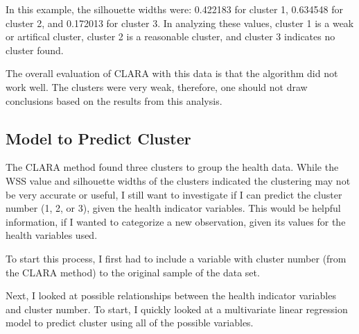 \documentclass[12pt,twoside]{amherstthesis}
\begin{document}
  In this example, the silhouette widths were: 0.422183 for cluster 1,
  0.634548 for cluster 2, and 0.172013 for cluster 3. In analyzing these
  values, cluster 1 is a weak or artifical cluster, cluster 2 is a
  reasonable cluster, and cluster 3 indicates no cluster found.
  
  The overall evaluation of CLARA with this data is that the algorithm did
  not work well. The clusters were very weak, therefore, one should not
  draw conclusions based on the results from this analysis.
  
  \subsection{Model to Predict Cluster}\label{model-to-predict-cluster}
  
  The CLARA method found three clusters to group the health data. While
  the WSS value and silhouette widths of the clusters indicated the
  clustering may not be very accurate or useful, I still want to
  investigate if I can predict the cluster number (1, 2, or 3), given the
  health indicator variables. This would be helpful information, if I
  wanted to categorize a new observation, given its values for the health
  variables used.
  
  To start this process, I first had to include a variable with cluster
  number (from the CLARA method) to the original sample of the data set.
  
  \begin{Shaded}
  \begin{Highlighting}[]
  \StringTok{ }\OperatorTok{$}
  \StringTok{ }
  \end{Highlighting}
  \end{Shaded}
  
  Next, I looked at possible relationships between the health indicator
  variables and cluster number. To start, I quickly looked at a
  multivariate linear regression model to predict cluster using all of the
  possible variables.
  
  \begin{Shaded}
  \begin{Highlighting}[]
  \StringTok{ }\OperatorTok{~}
  \end{Highlighting}
  \end{Shaded}
  
\end{document}
